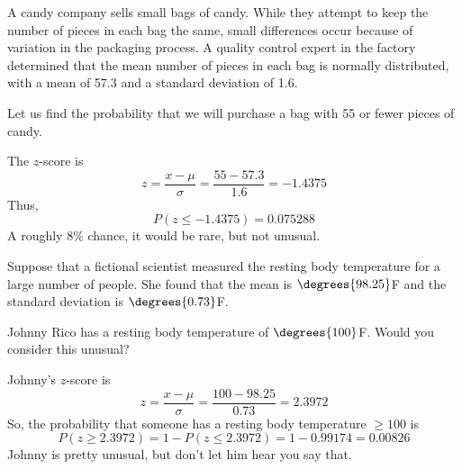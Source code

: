 \documentclass{beamer}
\newcommand{\prob}[1]{P\left(#1\right)}
\begin{document}
\begin{frame}
\begin{example}
A candy company sells small bags of candy. While they attempt to keep the number of pieces in each bag the same, small differences occur because of variation in the packaging process. A quality control expert in the factory determined that the mean number of pieces in each bag is normally distributed, with a mean of 57.3 and a standard deviation of 1.6.

\vspace{2mm}
Let us find the probability that we will purchase a bag with 55 or fewer pieces of candy.\pause

\vspace{2mm}
The $z$-score is
\begin{equation*}
z=\dfrac{x-\mu}{\sigma}=\dfrac{55-57.3}{1.6}=-1.4375
\end{equation*}\pause
Thus,
\begin{equation*}
\prob{z\leq-1.4375} = 0.075288
\end{equation*}
A roughly 8\% chance, it would be rare, but not unusual.
\end{example}
\end{frame}

\begin{frame}
\begin{example}
Suppose that a fictional scientist measured the resting body temperature for a large number of people. She found that the mean is $\degrees{98.25}$F and the standard deviation is $\degrees{0.73}$F.

\vspace{2mm}
Johnny  Rico has a resting body temperature of $\degrees{100}$F. Would you consider this unusual?\pause

\vspace{2mm}
Johnny's $z$-score is
\begin{equation*}
z=\dfrac{x-\mu}{\sigma}=\dfrac{100-98.25}{0.73} = 2.3972
\end{equation*}\pause
So, the probability that someone has a resting body temperature $\geq 100$ is
\begin{equation*}
\prob{z\geq 2.3972}=1-\prob{z\leq 2.3972} = 1-0.99174 = 0.00826
\end{equation*}
Johnny is pretty unusual, but don't let him hear you say that.
\end{example}
\end{frame}
\end{document}

